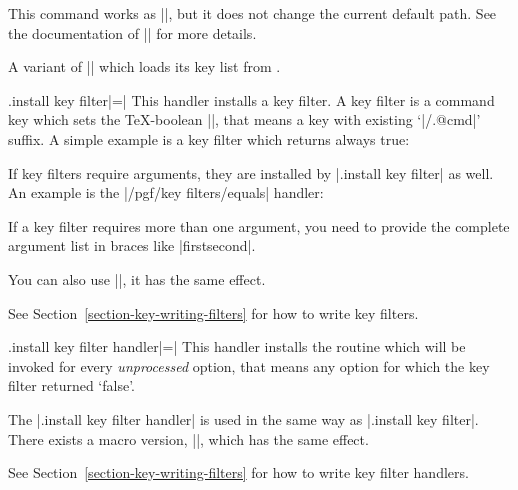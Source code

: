 \begin{command}{\pgfkeysalsofiltered{}}
    This command works as |\pgfkeysfiltered|, but it does not change the
    current default path. See the documentation of |\pgfkeysalso| for more
    details.
\end{command}

\begin{command}{\pgfkeysalsofilteredfrom{}}
    A variant of |\pgfkeysalsofiltered| which loads its key list from
    .
\end{command}

\begin{handler}{{.install key filter}|=|}
    This handler installs a key filter. A key filter is a command key which
    sets the \TeX-boolean |\ifpgfkeysfiltercontinue|, that means a key with
    existing `|/.@cmd|' suffix. A simple example is a key filter which returns
    always true:
\begin{codeexample}
\end{codeexample}
    If key filters require arguments, they are installed by
    |.install key filter| as well. An example is the |/pgf/key filters/equals|
    handler:
\begin{codeexample}[]
\end{codeexample}
    If a key filter requires more than one argument, you need to provide the
    complete argument list in braces like |{{first}{second}}|.

    You can also use |\pgfkeysinstallkeyfilter|, it has the same effect.

    See Section~\ref{section-key-writing-filters} for how to write key filters.
\end{handler}

\begin{handler}{{.install key filter handler}|=|}
    This handler installs the routine which will be invoked for every
    \emph{unprocessed} option, that means any option for which the key filter
    returned `false'.

    The |.install key filter handler| is used in the same way as
    |.install key filter|. There exists a macro version,
    |\pgfkeysinstallkeyfilterhandler|,
    which has the same effect.

    See Section~\ref{section-key-writing-filters} for how to write key filter
    handlers.
\end{handler}


